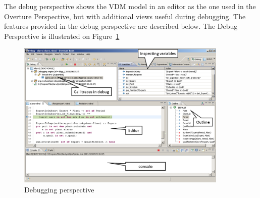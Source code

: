 \documentclass{overturerepchap}
\begin{document}
The debug perspective shows the VDM model in an editor as the one used in the
Overture Perspective, but with additional views useful during
debugging. The features provided in the debug perspective are described below.
The Debug Perspective is illustrated on Figure~\ref{fig:userguide:DebuggingVDM}

\begin{figure}[htp]
\begin{center}
  \includegraphics[width=380px]{figures/DebuggingVDM}
  \caption[Debugging perspective]{Debugging perspective}
  \label{fig:userguide:DebuggingVDM}
\end{center}
\end{figure}

\end{document}
